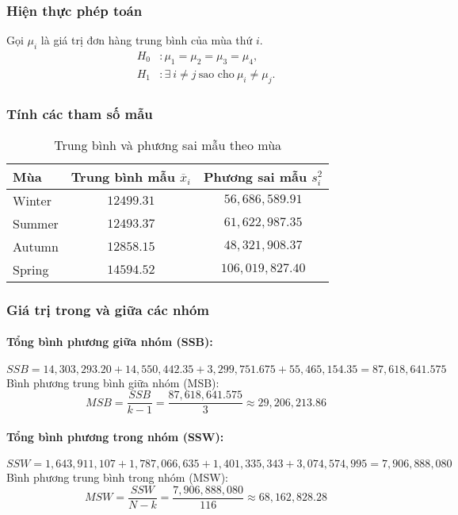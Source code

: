 \subsubsection{Hiện thực phép toán}
Gọi $\mu_i$ là giá trị đơn hàng trung bình của mùa thứ $i$.
\begin{align*}
    H_0 &: \mu_1 = \mu_2 = \mu_3 = \mu_4, \\
    H_1 &: \exists\ i \neq j \ \text{sao cho} \ \mu_i \neq \mu_j.
\end{align*}

\subsubsection{Tính các tham số mẫu}
\begin{table}[H]
\centering
\caption{Trung bình và phương sai mẫu theo mùa}
\begin{tabular}{lcc}
\hline
Mùa & Trung bình mẫu $\overline{x}_i$ & Phương sai mẫu $s_i^2$ \\ \hline
Winter  & $12499.31$ & $56,686,589.91$ \\
Summer  & $12493.37$ & $61,622,987.35$ \\
Autumn  & $12858.15$ & $48,321,908.37$ \\
Spring  & $14594.52$ & $106,019,827.40$ \\ \hline
\end{tabular}
\end{table}

\subsubsection{Giá trị trong và giữa các nhóm}

\paragraph{Tổng bình phương giữa nhóm (SSB):}
\[
SSB = 14,303,293.20 + 14,550,442.35 + 3,299,751.675 + 55,465,154.35 = 87,618,641.575
\]
Bình phương trung bình giữa nhóm (MSB):
\[
MSB = \frac{SSB}{k-1} = \frac{87,618,641.575}{3} \approx 29,206,213.86
\]

\paragraph{Tổng bình phương trong nhóm (SSW):}
\[
SSW = 1,643,911,107 + 1,787,066,635 + 1,401,335,343 + 3,074,574,995 = 7,906,888,080
\]
Bình phương trung bình trong nhóm (MSW):
\[
MSW = \frac{SSW}{N-k} = \frac{7,906,888,080}{116} \approx 68,162,828.28
\]

